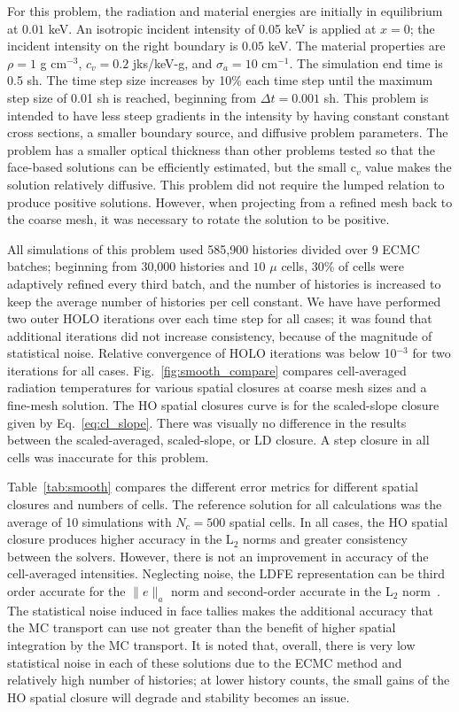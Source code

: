 For this problem, the radiation and material energies are initially in
equilibrium at $0.01$ keV.   An isotropic incident intensity of 0.05 keV is applied
at $x=0$; the incident intensity on the right boundary is $0.05$ keV.
The material properties are $\rho = 1$ g cm$^{-3}$, $c_v = 0.2$ jks/keV-g, and
$\sigma_a=10$ cm$^{-1}$.
The simulation end time is 0.5 sh.  The time step size increases by 10\% each time step
until the maximum step size of 0.01 sh is reached, beginning from $\Delta t = 0.001$ sh.
This problem is intended to have less steep gradients in the intensity by having constant constant cross
sections, a smaller boundary source, and diffusive problem parameters.
The problem has a smaller optical thickness than other problems tested so that the face-based solutions can be efficiently
estimated, but the small c$_v$ value makes the solution relatively diffusive.  This
problem did not require the lumped relation to produce positive solutions.
However, when projecting from a refined mesh back to the coarse mesh, it was
necessary to rotate the solution to be positive.

All simulations of this problem used 585,900 histories divided over 9 ECMC
batches;  beginning from 30,000 histories and $10$ $\mu$ cells, 30\% of cells were
adaptively refined every third batch, and the number of histories is increased to
keep the average number of histories per cell constant. 
We have have performed two outer HOLO iterations over each time step for all cases; it was
found that additional iterations did not increase consistency, because of the  magnitude
of statistical noise.  Relative convergence of HOLO iterations was below 10$^{-3}$
for two iterations for all cases.  
Fig.~\ref{fig:smooth_compare} compares cell-averaged radiation temperatures for various spatial closures at
coarse mesh sizes and a fine-mesh solution.  The HO spatial closures curve is for the
scaled-slope closure given by Eq.~\eqref{eq:cl_slope}.  There was visually
no difference in the results between the scaled-averaged, scaled-slope, or LD closure. A step closure in all cells
was inaccurate for this problem.

Table~\ref{tab:smooth} compares the different error metrics for different spatial
closures and numbers of cells.  The reference solution for all calculations was the average of 10 simulations with $N_c=500$ spatial
cells.  In all cases, the HO spatial closure produces higher accuracy in the L$_2$
norms and greater consistency between the solvers.  However, there is not an
improvement in accuracy of the cell-averaged intensities.  Neglecting noise, the LDFE representation can be third order
accurate for the $\|e\|_a$ norm and second-order accurate in the L$_2$ norm~\cite{morel_ldtrt}. 
The statistical noise induced in face tallies makes the
additional accuracy that the MC transport can use not greater than the benefit of
higher spatial integration by the MC transport.  It
is noted that, overall, there is very low statistical noise in each of these
solutions due to the ECMC method and relatively high number of histories; at lower
history counts, the small gains of the HO spatial closure will degrade and stability
becomes an issue.

